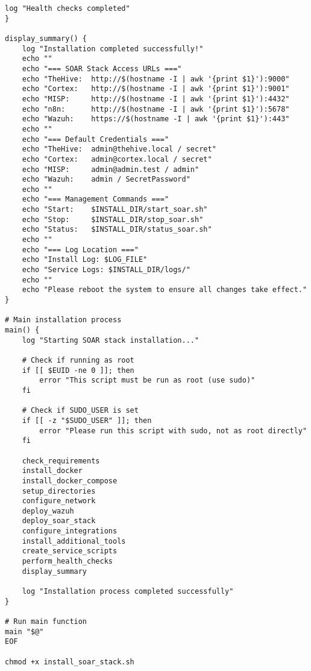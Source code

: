 \begin{lstlisting}[style=bashstyle,caption=Script d'installation complete de la stack SOAR]
    log "Health checks completed"
}

display_summary() {
    log "Installation completed successfully!"
    echo ""
    echo "=== SOAR Stack Access URLs ==="
    echo "TheHive:  http://$(hostname -I | awk '{print $1}'):9000"
    echo "Cortex:   http://$(hostname -I | awk '{print $1}'):9001"
    echo "MISP:     http://$(hostname -I | awk '{print $1}'):4432"
    echo "n8n:      http://$(hostname -I | awk '{print $1}'):5678"
    echo "Wazuh:    https://$(hostname -I | awk '{print $1}'):443"
    echo ""
    echo "=== Default Credentials ==="
    echo "TheHive:  admin@thehive.local / secret"
    echo "Cortex:   admin@cortex.local / secret"  
    echo "MISP:     admin@admin.test / admin"
    echo "Wazuh:    admin / SecretPassword"
    echo ""
    echo "=== Management Commands ==="
    echo "Start:    $INSTALL_DIR/start_soar.sh"
    echo "Stop:     $INSTALL_DIR/stop_soar.sh"
    echo "Status:   $INSTALL_DIR/status_soar.sh"
    echo ""
    echo "=== Log Location ==="
    echo "Install Log: $LOG_FILE"
    echo "Service Logs: $INSTALL_DIR/logs/"
    echo ""
    echo "Please reboot the system to ensure all changes take effect."
}

# Main installation process
main() {
    log "Starting SOAR stack installation..."
    
    # Check if running as root
    if [[ $EUID -ne 0 ]]; then
        error "This script must be run as root (use sudo)"
    fi
    
    # Check if SUDO_USER is set
    if [[ -z "$SUDO_USER" ]]; then
        error "Please run this script with sudo, not as root directly"
    fi
    
    check_requirements
    install_docker
    install_docker_compose
    setup_directories
    configure_network
    deploy_wazuh
    deploy_soar_stack
    configure_integrations
    install_additional_tools
    create_service_scripts
    perform_health_checks
    display_summary
    
    log "Installation process completed successfully"
}

# Run main function
main "$@"
EOF

chmod +x install_soar_stack.sh
\end{lstlisting}

\newpage
